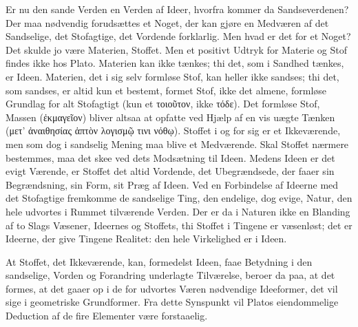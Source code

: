 \documentclass[12pt,a4paper]{book}
\begin{document}
Er nu den sande Verden en Verden af Ideer, hvorfra kommer da Sandseverdenen?
Der maa nødvendig forudsættes et Noget, der kan gjøre en Medværen af det
Sandselige, det Stofagtige, det Vordende forklarlig. Men hvad er det for et
Noget? Det skulde jo være Materien, Stoffet. Men et positivt Udtryk for
Materie og Stof findes ikke hos Plato. Materien kan ikke tænkes; thi det, som
i Sandhed tænkes, er Ideen. Materien, det i sig selv formløse Stof, kan heller
ikke sandses; thi det, som sandses, er altid kun et bestemt, formet Stof, ikke
det almene, formløse Grundlag for alt Stofagtigt (kun et τοιοῦτον, ikke τόδε).
Det formløse Stof, Massen (ἐκμαγεῖον) bliver altsaa at opfatte ved Hjælp af en
vis uægte Tænken (μετ’ ἀναιθησίας ἁπτὸν λογισμῷ τινι νόθῳ). Stoffet i og for
sig er et Ikkeværende, men som dog i sandselig Mening maa blive et
Medværende. Skal Stoffet nærmere bestemmes, maa det skee ved dets Modsætning
til Ideen. Medens Ideen er det evigt Værende, er Stoffet det altid Vordende,
det Ubegrændsede, der faaer sin Begrændsning, sin Form, sit Præg af Ideen. Ved
en Forbindelse af Ideerne med det Stofagtige fremkomme de sandselige Ting, den
endelige, dog evige, Natur, den hele udvortes i Rummet tilværende Verden. Der
er da i Naturen ikke en Blanding af to Slags Væsener, Ideernes og Stoffets,
thi Stoffet i Tingene er væsenløst; det er Ideerne, der give Tingene Realitet:
den hele Virkelighed er i Ideen.

At Stoffet, det Ikkeværende, kan, formedelst Ideen, faae Betydning i den
sandselige, Vorden og Forandring underlagte Tilværelse, beroer da paa, at det
formes, at det gaaer op i de for udvortes Væren nødvendige Ideeformer, det vil
sige i geometriske Grundformer. Fra dette Synspunkt vil Platos eiendommelige
Deduction af de fire Elementer være forstaaelig.
\end{document}
